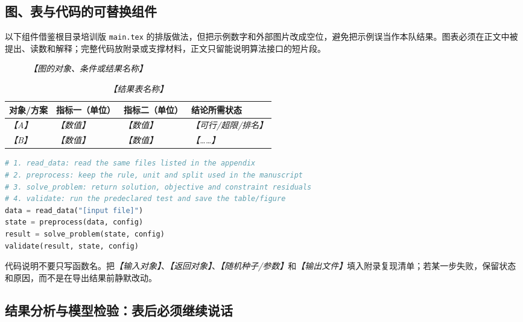 \documentclass[UTF8,zihao=-4]{ctexart}
\newcommand{\slot}[1]{\textcolor{inkblue}{\textit{【#1】}}}
\begin{document}
\subsection{图、表与代码的可替换组件}

以下组件借鉴根目录培训版 \texttt{main.tex} 的排版做法\cite{friendtemplate}，但把示例数字和外部图片改成空位，避免把示例误当作本队结果。图表必须在正文中被提出、读数和解释；完整代码放附录或支撑材料，正文只留能说明算法接口的短片段。

\begin{figure}[htbp]
  \centering
  \fbox{\rule{0pt}{3.0cm}\rule{0.82\linewidth}{0pt}}
  \caption{\slot{图的对象、条件或结果名称}}
  \label{fig:template-placeholder}
\end{figure}

\begin{table}[htbp]
  \centering
  \caption{\slot{结果表名称}}
  \label{tab:template-result}
  \begin{tabular}{p{3.2cm}p{3.0cm}p{3.0cm}p{3.2cm}}
    \toprule
    对象/方案 & 指标一（单位） & 指标二（单位） & 结论所需状态\\
    \midrule
    \slot{A} & \slot{数值} & \slot{数值} & \slot{可行/超限/排名}\\
    \slot{B} & \slot{数值} & \slot{数值} & \slot{……}\\
    \bottomrule
  \end{tabular}
\end{table}

\begin{lstlisting}[language=Python,caption={分问代码入口与输出接口示例},label={lst:template-code}]
# 1. read_data: read the same files listed in the appendix
# 2. preprocess: keep the rule, unit and split used in the manuscript
# 3. solve_problem: return solution, objective and constraint residuals
# 4. validate: run the predeclared test and save the table/figure
data = read_data("[input file]")
state = preprocess(data, config)
result = solve_problem(state, config)
validate(result, state, config)
\end{lstlisting}

代码说明不要只写函数名。把\slot{输入对象}、\slot{返回对象}、\slot{随机种子/参数}和\slot{输出文件}填入附录复现清单；若某一步失败，保留状态和原因，而不是在导出结果前静默改动。

\subsection{结果分析与模型检验：表后必须继续说话}
\end{document}
